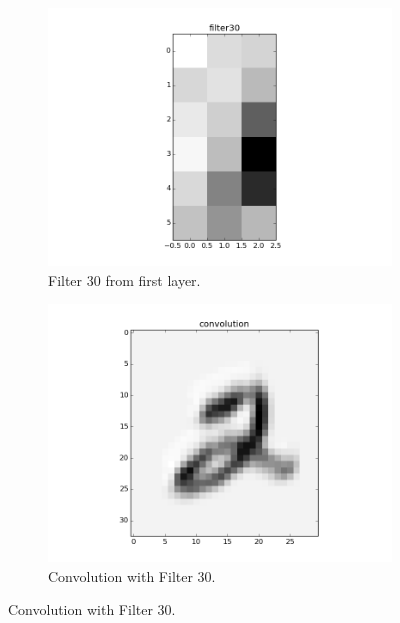 \documentclass{article}
\begin{document}
\begin{figure}[h]
	\centering
	\begin{subfigure}[b]{0.45\textwidth} 
		\includegraphics[width=\textwidth]{graphics/aniso2.png}
		\caption{Filter 30 from first layer.}
		\label{fig15}
	\end{subfigure}
	\begin{subfigure}[b]{0.45\textwidth} 
		\includegraphics[width=\textwidth]{graphics/conv_aniso2.png}
		\caption{Convolution with Filter 30.}
		\label{fig16}
	\end{subfigure}
\end{figure}
\end{document}
